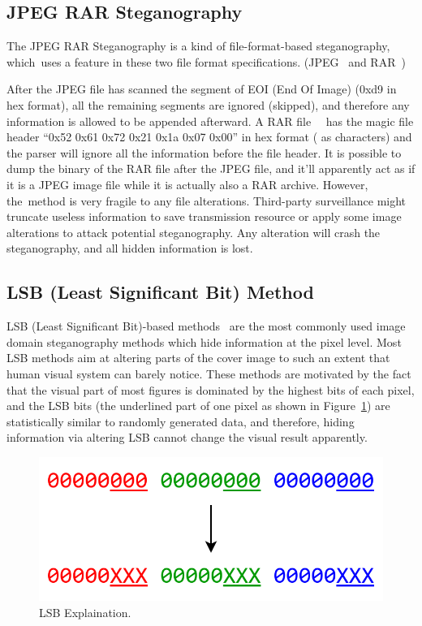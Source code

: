 \documentclass[futureinternet,article,accept,moreauthors,pdftex,10pt,a4paper]{Definitions/mdpi}
\begin{document}
\subsection{JPEG RAR Steganography}%
\label{ssec:jpegrar}

The JPEG RAR Steganography is a kind of file-format-based steganography, which~uses a feature in these two file format specifications. (JPEG~\cite{jpegspec} and RAR~\cite{rarspec})

After the JPEG file has scanned the segment of EOI (End Of Image) (0xd9 in hex format), all the remaining segments are ignored (skipped), and therefore any information is allowed to be appended afterward. A RAR file~~\cite{rarspec} has the magic file header ``0x52 0x61 0x72 0x21 0x1a 0x07 0x00'' in hex format ( as characters) and the parser will ignore all the information before the file header. It is possible to dump the binary of the RAR file after the JPEG file, and it'll apparently act as if it is a JPEG image file while it is actually also a RAR archive. However, the~method is very fragile to any file alterations. Third-party surveillance might truncate useless information to save transmission resource or apply some image alterations to attack potential steganography. Any alteration will crash the steganography, and all hidden information is lost.

\subsection{LSB (Least Significant Bit) Method}%
\label{ssec:lsbmethod}

LSB (Least Significant Bit)-based methods~\cite{LSBRevisited} are the most commonly used image domain steganography methods which hide information at the pixel level. Most LSB methods aim at altering parts of the cover image to such an extent that human visual system can barely notice. These methods are motivated by the fact that the visual part of most figures is dominated by the highest bits of each pixel, and the LSB bits (the underlined part of one pixel as shown in Figure~\ref{fig:lsbexplained}) are statistically similar to randomly generated data, and therefore, hiding information via altering LSB cannot change the visual result apparently.

\begin{figure}[H]
  \centering
  \includegraphics[width=0.5\linewidth]{LSB_explained}
  \caption{LSB Explaination.}%
\label{fig:lsbexplained}
\end{figure}
\end{document}
